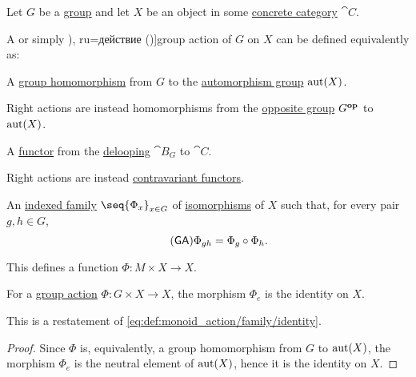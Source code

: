 \begin{definition}\label{def:group_action}
  Let \( G \) be a \hyperref[def:group]{group} and let \( X \) be an object in some \hyperref[def:concrete_category]{concrete category} \( \cat{C} \).

  A  or simply \term[bg=действие (\cite[def. IV.18]{ГеновМиховскиМоллов1991Алгебра}), ru=действие (\cite[def. 10.3.1]{Винберг2014Алгебра})]{group action} of \( G \) on \( X \) can be defined equivalently as:
  \begin{thmenum}
     A \hyperref[def:group/homomorphism]{group homomorphism} from \( G \) to the \hyperref[def:automorphism_group]{automorphism group} \( \operatorname{aut}(X) \).

    Right actions are instead homomorphisms from the \hyperref[def:group/opposite]{opposite group} \( G^\oppos \) to \( \operatorname{aut}(X) \).

     A \hyperref[def:functor]{functor} from the \hyperref[def:monoid_delooping]{delooping} \( \cat{B}_G \) to \( \cat{C} \).

    Right actions are instead \hyperref[rem:contravariant_functor]{contravariant functors}.

     An \hyperref[def:cartesian_product/indexed_family]{indexed family} \( \seq{ \Phi_x }_{x \in G} \) of \hyperref[def:morphism_invertibility/isomorphism]{isomorphisms} of \( X \) such that, for every pair \( g, h \in G \),
    \begin{equation}\label{eq:def:group_action/family/compatibility}\tag{\logic{GA}}
      \Phi_{gh} = \Phi_g \bincirc \Phi_h.
    \end{equation}

    This defines a function \( \Phi: M \times X \to X \).
  \end{thmenum}
\end{definition}

\begin{proposition}\label{thm:group_action_of_neutral_element}
  For a \hyperref[def:group_action]{group action} \( \Phi: G \times X \to X \), the morphism \( \Phi_e \) is the identity on \( X \).
\end{proposition}
\begin{comments}
  \item This is a restatement of \eqref{eq:def:monoid_action/family/identity}.
\end{comments}
\begin{proof}
  Since \( \Phi \) is, equivalently, a group homomorphism from \( G \) to \( \operatorname{aut}(X) \), the morphism \( \Phi_e \) is the neutral element of \( \operatorname{aut}(X) \), hence it is the identity on \( X \).
\end{proof}

